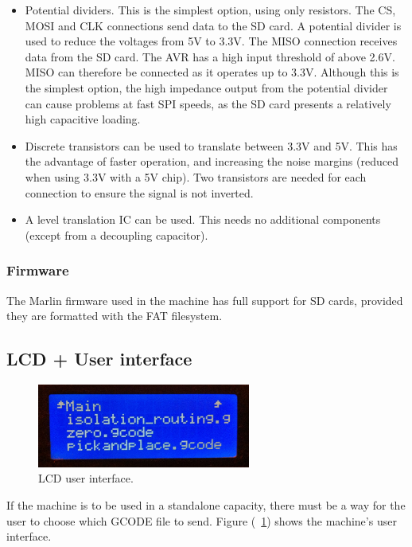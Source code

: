 \begin{itemize} \itemsep0em
	\item	Potential dividers. This is the simplest option, using only resistors. The CS, MOSI and CLK connections send data to the SD card. A potential divider is used to reduce the voltages
			from 5V to 3.3V. The MISO connection receives data from the SD card. The AVR has a high input threshold of above 2.6V. MISO can therefore be connected as it operates up to 3.3V. 
			Although this is the simplest option, the high impedance output from the potential divider can cause problems at fast SPI speeds, as the SD card presents a relatively high
			capacitive loading.
	\item	Discrete transistors can be used to translate between 3.3V and 5V. This has the advantage of faster operation, and increasing the noise margins (reduced when using 3.3V with a 5V chip).
			Two transistors are needed for each connection to ensure the signal is not inverted.
	\item	A level translation IC can be used. This needs no additional components (except from a decoupling capacitor).
\end{itemize}

\subsubsection {Firmware}
The Marlin firmware used in the machine has full support for SD cards, provided they are formatted with the FAT filesystem.

\subsection{LCD + User interface}
\label{lcdUI}

\begin{figure}[ht!]
\centering
\includegraphics[width=70mm]{resources/lcd_real.jpg}
\caption{LCD user interface.}
\label{lcdreal}
\end{figure}

If the machine is to be used in a standalone capacity, there must be a way for the user to choose which GCODE file to send.
Figure (~\ref{lcdreal}) shows the machine's user interface.

